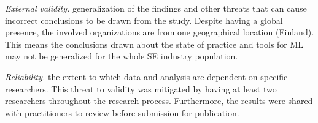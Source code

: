 \textit{External validity.} \DIFdelbegin {}\DIFdelend \DIFaddbegin {}\DIFaddend generalization of the findings and other threats that can cause incorrect conclusions to be drawn from the study. Despite having a global presence, the involved organizations are from one geographical location (Finland). This means the conclusions drawn about the state of practice and tools for ML may not be generalized for the whole SE industry population. 

\textit{Reliability.} \DIFdelbegin {}\DIFdelend \DIFaddbegin {}\DIFaddend the extent to which data and analysis are dependent on specific researchers. This threat to validity was mitigated by having at least two researchers throughout the research process. Furthermore, the results were shared with practitioners to review before submission for publication.








